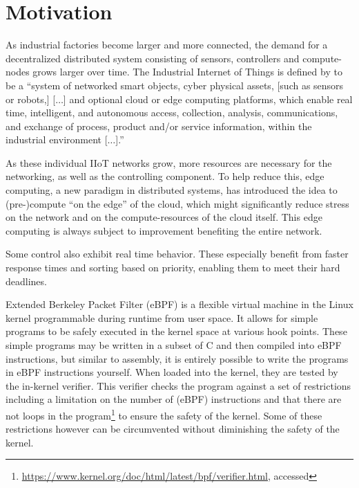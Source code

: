 \section{Motivation}


As industrial factories become larger and more connected, the demand for a
decentralized distributed system consisting of sensors, controllers and
compute-nodes grows larger over time.
The Industrial Internet of Things is defined by
\citeauthor{boyes_industrial_2018} to be a \enquote{system of networked smart
    objects, cyber physical assets, [such as sensors or robots,] [$\dots$] and
    optional cloud or edge computing platforms, which enable real time,
    intelligent, and autonomous access, collection, analysis, communications,
    and exchange of process, product and/or service information, within the
    industrial environment [$\dots$].}%


As these individual IIoT networks grow, more resources are necessary for the
networking, as well as the controlling component. To help reduce this, edge
computing, a new paradigm in distributed systems, has introduced the idea to
(pre-)compute \enquote{on the edge} of the cloud, which might significantly
reduce stress on the network and on the compute-resources of the cloud itself.
This edge computing is always subject to improvement benefiting the entire network.

Some control also exhibit real time behavior. These especially benefit from
faster response times and sorting based on priority, enabling them to meet their
hard deadlines.

Extended Berkeley Packet Filter (eBPF) is a flexible virtual machine in the
Linux kernel programmable during runtime from user space. It allows for simple
programs to be safely executed in the kernel space at various hook points. These
simple programs may be written in a subset of C and then compiled into eBPF
instructions, but similar to assembly, it is entirely possible to write the
programs in eBPF instructions yourself. When loaded into the kernel, they are
tested by the in-kernel verifier. This verifier checks the program against a set
of restrictions including a limitation on the number of (eBPF) instructions and
that there are not loops in the
program\footnote{\url{https://www.kernel.org/doc/html/latest/bpf/verifier.html},
accessed } to
ensure the safety of the kernel. Some of these restrictions however can be
circumvented without diminishing the safety of the kernel.



